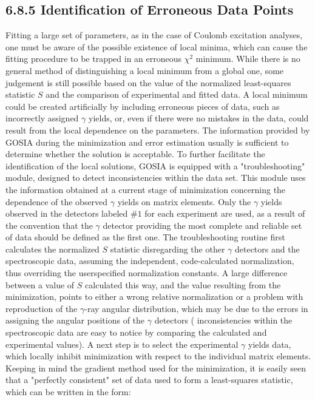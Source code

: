 \documentclass[10pt]{article}
\begin{document}
\subsection*{6.8.5 Identification of Erroneous Data Points}
Fitting a large set of parameters, as in the case of Coulomb excitation analyses, one must be aware of the possible existence of local minima, which can cause the fitting procedure to be trapped in an erroneous $\chi^{2}$ minimum. While there is no general method of distinguishing a local minimum from a global one, some judgement is still possible based on the value of the normalized least-squares statistic $S$ and the comparison of experimental and fitted data. A local minimum could be created artificially by including erroneous pieces of data, such as incorrectly assigned $\gamma$ yields, or, even if there were no mistakes in the data, could result from the local dependence on the parameters. The information provided by GOSIA during the minimization and error estimation usually is sufficient to determine whether the solution is acceptable. To further facilitate the identification of the local solutions, GOSIA is equipped with a "troubleshooting" module, designed to detect inconsistencies within the data set. This module uses the information obtained at a current stage of minimization concerning the dependence of the observed $\gamma$ yields on matrix elements. Only the $\gamma$ yields observed in the detectors labeled $\# 1$ for each experiment are used, as a result of the convention that the $\gamma$ detector providing the most complete and reliable set of data should be defined as the first one. The troubleshooting routine first calculates the normalized $S$ statistic disregarding the other $\gamma$ detectors and the spectroscopic data, assuming the independent, code-calculated normalization, thus overriding the userspecified normalization constants. A large difference between a value of $S$ calculated this way, and the value resulting from the minimization, points to either a wrong relative normalization or a problem with reproduction of the $\gamma$-ray angular distribution, which may be due to the errors in assigning the angular positions of the $\gamma$ detectors ( inconsistencies within the spectroscopic data are easy to notice by comparing the calculated and experimental values). A next step is to select the experimental $\gamma$ yields data, which locally inhibit minimization with respect to the individual matrix elements. Keeping in mind the gradient method used for the minimization, it is easily seen that a "perfectly consistent" set of data used to form a least-squares statistic, which can be written in the form:
\end{document}
